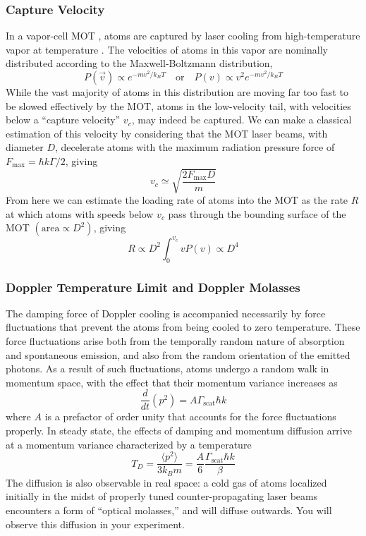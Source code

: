 \documentclass{../lab}
\begin{document}
\subsubsection{Capture Velocity}
\label{subsubsec:CaptureVelocity}

In a vapor-cell MOT \cite{Monroe}, atoms are captured by laser cooling from high-temperature vapor at temperature . The velocities of atoms in this vapor are nominally distributed according to the Maxwell-Boltzmann distribution,
\begin{equation}
    P(\vec{v}) \propto e^{-mv^2/k_BT}
    \quad \text{or} \quad
    P(v) \propto v^2e^{-mv^2/k_BT}
\end{equation}
While the vast majority of atoms in this distribution are moving far too fast to be slowed effectively by the MOT, atoms in the low-velocity tail, with velocities below a ``capture velocity'' $v_c$, may indeed be captured. We can make a classical estimation of this velocity by considering that the MOT laser beams, with diameter $D$, decelerate atoms with the maximum radiation pressure force of $F_\text{max} = \hbar k \Gamma/2$, giving
\begin{equation}
    v_c \simeq \sqrt{\frac{2F_\text{max}D}{m}}
\end{equation}
From here we can estimate the loading rate of atoms into the MOT as the rate $R$ at which atoms with speeds below $v_c$ pass through the bounding surface of the MOT $\left(\text{area} \propto D^2\right)$, giving
\begin{equation}
    R \propto D^2 \int_0^{v_c} v P(v) \propto D^4
\end{equation}

\subsubsection{Doppler Temperature Limit and Doppler Molasses}

The damping force of Doppler cooling is accompanied necessarily by force fluctuations that prevent the atoms from being cooled to zero temperature. These force fluctuations arise both from the temporally random nature of absorption and spontaneous emission, and also from the random orientation of the emitted photons. As a result of such fluctuations, atoms undergo a random walk in momentum space, with the effect that their momentum variance increases as
\begin{equation}
    \frac{d}{dt}(p^2) = A\Gamma_\text{scat}\hbar k
\end{equation}
where $ A$ is a prefactor of order unity that accounts for the force fluctuations properly. In steady state, the effects of damping and momentum diffusion arrive at a momentum variance characterized by a temperature
\begin{equation}
    T_D = \frac{\langle p^2\rangle}{3 k_B m} = \frac{A}{6}\frac{\Gamma_\text{scat}\hbar k}{\beta}
\end{equation}
The diffusion is also observable in real space: a cold gas of atoms localized initially in the midst of properly tuned counter-propagating laser beams encounters a form of ``optical molasses,'' and will diffuse outwards. You will observe this diffusion in your experiment.
\end{document}
